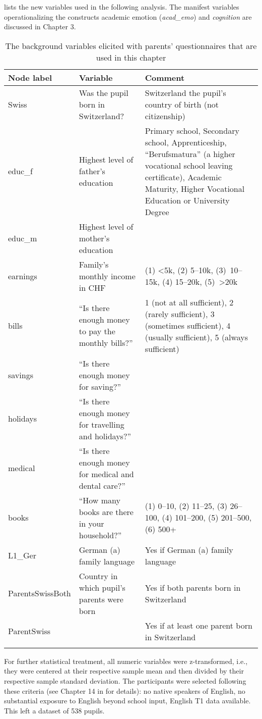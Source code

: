 \documentclass[output=paper]{langsci/langscibook}
\begin{document}
 lists the new variables used in the following analysis. The manifest variables operationalizing the constructs academic emotion (\textit{acad\_emo}) and \textit{cognition} are discussed in Chapter 3.

\begin{sidewaystable}\small
\caption{The background variables elicited with parents’ questionnaires that are used in this chapter\label{tab:05:1}}
\begin{tabularx}{\textwidth}{lQQ}
\lsptoprule
{Node label} & {Variable} & {Comment}\\\midrule
Swiss & Was the pupil born in Switzerland? & Switzerland the pupil’s country of birth (not citizenship)\\
educ\_f & Highest level of father’s education & Primary school, Secondary school, Apprenticeship, “Berufsmatura” (a higher vocational school leaving certificate),  Academic Maturity, Higher Vocational Education or University Degree\\
educ\_m & Highest level of mother’s education & \\
earnings & Family’s monthly income in CHF & (1) <5k, (2) 5--10k, (3)~10--15k, (4) 15--20k, (5)~>20k\\
bills & “Is there enough money to pay the monthly bills?” & 1 (not at all sufficient), 2 (rarely sufficient), 3 (sometimes sufficient), 4 (usually sufficient), 5 (always sufficient)\\
savings & “Is there enough money for saving?” & \\
holidays & “Is there enough money for travelling and holidays?” & \\
medical & “Is there enough money for medical and dental care?” & \\
books & “How many books are there in your household?” & (1) 0--10, (2) 11--25, (3) 26--100, (4) 101--200, (5) 201--500, (6) 500+\\
L1\_Ger & German (a) family language & Yes if German (a) family language\\
ParentsSwissBoth & Country in which pupil’s parents were born & Yes if both parents born in Switzerland\\
ParentSwiss &  & Yes if at least one parent born in Switzerland\\
\lspbottomrule
\end{tabularx}
\end{sidewaystable}

For further statistical treatment, all numeric variables were z-transformed, i.e., they were centered at their respective sample mean and then divided by their respective sample standard deviation. The participants were selected following these criteria (see Chapter 14 in \citealt{Vanhove2021} for details): no native speakers of English, no substantial exposure to English beyond school input, English T1 data available. This left a dataset of 538 pupils.
\end{document}
